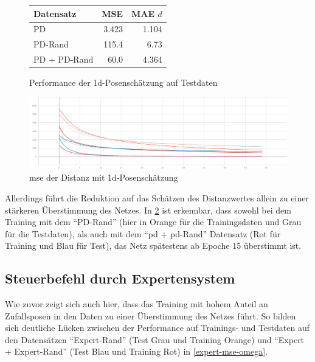 \begin{figure}[H]
	\centering
	\begin{tabular}[t]{|l|r|r|}
		\hline
		Datensatz & MSE & MAE $d$ \\
		\hline
		PD & 3.423 & 1.104 \\
		\hline
		PD-Rand & 115.4 & 6.73 \\
		\hline
		PD + PD-Rand & 60.0 & 4.364 \\
		\hline
	\end{tabular}
	\caption{Performance der \acs{1d}-Posenschätzung auf Testdaten}
	\label{1d-pose-performance}
\end{figure}

\begin{figure}[H]
	\centering
	\includegraphics[width=\linewidth]{kapitel5/images/d-only/Loss-d-only.png}
	\caption{\acs{mse} der Distanz mit \acs{1d}-Posenschätzung}
	\label{1d-poses-mse-d}
\end{figure}

Allerdings führt die Reduktion auf das Schätzen des Distanzwertes allein zu einer stärkeren Überstimmung des Netzes. In \ref{1d-poses-mse-d} ist erkennbar, dass sowohl bei dem Training mit dem ``PD-Rand'' (hier in Orange für die Trainingsdaten und Grau für die Testdaten), als auch mit dem ``\acs{pd} + \acs{pd}-Rand'' Datensatz (Rot für Training und Blau für Test), das Netz spätestens ab Epoche 15 überstimmt ist.

\subsection{Steuerbefehl durch Expertensystem}


Wie zuvor zeigt sich auch hier, dass das Training mit hohem Anteil an Zufallsposen in den Daten zu einer Überstimmung des Netzes führt. So bilden sich deutliche Lücken zwischen der Performance auf Trainings- und Testdaten auf den Datensätzen ``Expert-Rand'' (Test Grau und Training Orange) und ``Expert + Expert-Rand'' (Test Blau und Training Rot) in \ref{expert-mse-omega}.


